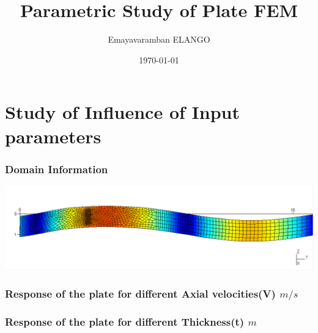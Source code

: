 \documentclass[9pt]{beamer}
\title{Parametric Study of Plate FEM }
\author{Emayavaramban ELANGO}
\institute{\'Ecole centrale De Nantes}
\date{\today}
\begin{document}


\begin{frame}
\maketitle
\end{frame}


\frame{\tableofcontents}

\section{Study of Influence of Input parameters}

\begin{frame}
\frametitle{Domain Information}
\begin{figure}[h!]
\centering

\end{figure}


\href{run:Young/1E11/Dynamic.mpg}{\includegraphics[width=1.0\textwidth,trim={0cm 0cm 0cm 0cm},clip]{Young/1E11/Dynamic.png}}



\end{frame}




\begin{frame}
\frametitle{Response of the plate for different Axial velocities(V) $m/s $}
\begin{figure}[h!]
\centering

\end{figure}
\end{frame}

\begin{frame}
\frametitle{Response of the plate for different Thickness(t) $m$ }
\begin{figure}[h!]
\centering

\end{figure}
\end{frame}
\end{document}

